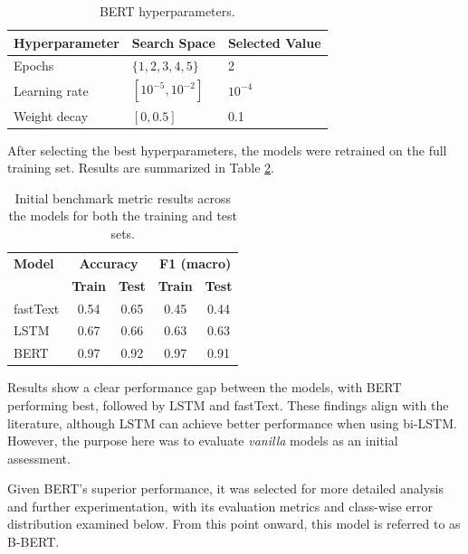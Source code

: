 \documentclass[conference]{IEEEtran}
\begin{document}
\begin{table}[H]
    \begin{subtable}[t]{0.45\textwidth}
        \centering
        \begin{tabular}{lll}
        \toprule
        \textbf{Hyperparameter} \phantom{aaah} & \textbf{Search Space} \phantom{aaa} & \textbf{Selected Value} \\
        \midrule
        Epochs & $\{1,2,3,4,5\}$ & 2 \\
        Learning rate & $[10^{-5}, 10^{-2}]$ & $10^{-4}$ \\
        Weight decay & $[0, 0.5]$ & 0.1 \\
        \bottomrule
        \end{tabular}
        \vspace{.3em}
        \caption{BERT hyperparameters.}
        \label{parameters_basebert}
    \end{subtable}
\end{table}

After selecting the best hyperparameters, the models were retrained on the full training set. Results are summarized in Table \ref{basemodel_models}.

\begin{table}[H]
\centering
\caption{Initial benchmark metric results across the models for both the training and test sets.}
\label{basemodel_models}
\begin{tabular}{lcccc}
\toprule
\textbf{Model} & \multicolumn{2}{c}{\textbf{Accuracy}} & \multicolumn{2}{c}{\textbf{F1 (macro)}} \\
\cmidrule(lr){2-3} \cmidrule(lr){4-5}
 & \textbf{Train} & \textbf{Test} & \textbf{Train} & \textbf{Test} \\
\midrule
fastText & 0.54 & 0.65 & 0.45 & 0.44 \\
LSTM & 0.67 & 0.66 & 0.63 & 0.63 \\
BERT & 0.97 & 0.92 & 0.97 & 0.91 \\
\bottomrule
\end{tabular}
\end{table}

Results show a clear performance gap between the models, with BERT performing best, followed by LSTM and fastText. These findings align with the literature, although LSTM can achieve better performance when using bi-LSTM. However, the purpose here was to evaluate \textit{vanilla} models as an initial assessment.

Given BERT's superior performance, it was selected for more detailed analysis and further experimentation, with its evaluation metrics and class-wise error distribution examined below. From this point onward, this model is referred to as B-BERT. 
\end{document}
